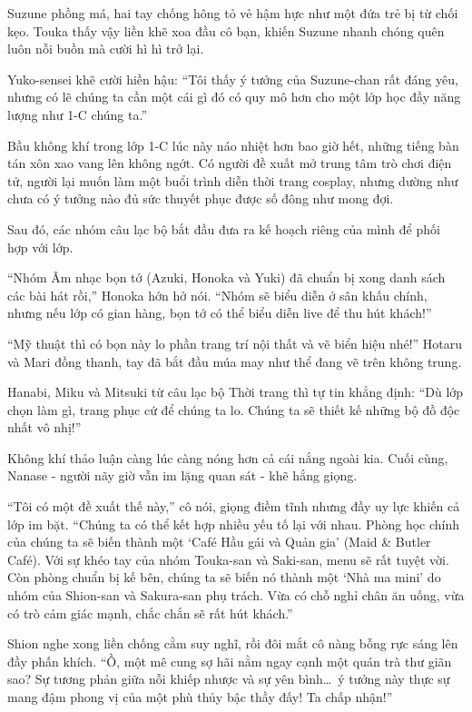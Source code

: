 \documentclass[../main.tex]{subfiles}
\begin{document}
Suzune phồng má, hai tay chống hông tỏ vẻ hậm hực như một đứa trẻ bị từ chối kẹo. Touka thấy vậy liền khẽ xoa đầu cô bạn, khiến Suzune nhanh chóng quên luôn nỗi buồn mà cười hì hì trở lại.

Yuko-sensei khẽ cười hiền hậu: ``Tôi thấy ý tưởng của Suzune-chan rất đáng yêu, nhưng có lẽ chúng ta cần một cái gì đó có quy mô hơn cho một lớp học đầy năng lượng như 1-C chúng ta.''

Bầu không khí trong lớp 1-C lúc này náo nhiệt hơn bao giờ hết, những tiếng bàn tán xôn xao vang lên không ngớt. Có người đề xuất mở trung tâm trò chơi điện tử, người lại muốn làm một buổi trình diễn thời trang cosplay, nhưng dường như chưa có ý tưởng nào đủ sức thuyết phục được số đông như mong đợi.

Sau đó, các nhóm câu lạc bộ bắt đầu đưa ra kế hoạch riêng của mình để phối hợp với lớp.

``Nhóm Âm nhạc bọn tớ (Azuki, Honoka và Yuki) đã chuẩn bị xong danh sách các bài hát rồi,'' Honoka hớn hở nói. ``Nhóm sẽ biểu diễn ở sân khấu chính, nhưng nếu lớp có gian hàng, bọn tớ có thể biểu diễn live để thu hút khách!''

``Mỹ thuật thì có bọn này lo phần trang trí nội thất và vẽ biển hiệu nhé!'' Hotaru và Mari đồng thanh, tay đã bắt đầu múa may như thể đang vẽ trên không trung.

Hanabi, Miku và Mitsuki từ câu lạc bộ Thời trang thì tự tin khẳng định: ``Dù lớp chọn làm gì, trang phục cứ để chúng ta lo. Chúng ta sẽ thiết kế những bộ đồ độc nhất vô nhị!''

Không khí thảo luận càng lúc càng nóng hơn cả cái nắng ngoài kia. Cuối cùng, Nanase - người nãy giờ vẫn im lặng quan sát - khẽ hắng giọng.

``Tôi có một đề xuất thế này,'' cô nói, giọng điềm tĩnh nhưng đầy uy lực khiến cả lớp im bặt. ``Chúng ta có thể kết hợp nhiều yếu tố lại với nhau. Phòng học chính của chúng ta sẽ biến thành một `Café Hầu gái và Quản gia' (Maid \& Butler Café). Với sự khéo tay của nhóm Touka-san và Saki-san, menu sẽ rất tuyệt vời. Còn phòng chuẩn bị kế bên, chúng ta sẽ biến nó thành một `Nhà ma mini' do nhóm của Shion-san và Sakura-san phụ trách. Vừa có chỗ nghỉ chân ăn uống, vừa có trò cảm giác mạnh, chắc chắn sẽ rất hút khách.''

Shion nghe xong liền chống cằm suy nghĩ, rồi đôi mắt cô nàng bỗng rực sáng lên đầy phấn khích. ``Ồ, một mê cung sợ hãi nằm ngay cạnh một quán trà thư giãn sao? Sự tương phản giữa nỗi khiếp nhược và sự yên bình\dots\ ý tưởng này thực sự mang đậm phong vị của một phù thủy bậc thầy đấy! Ta chấp nhận!''
\end{document}

